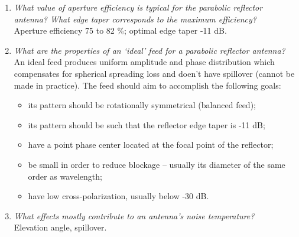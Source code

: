 \documentclass[11pt,a4paper]{article}
\begin{document}
\begin{enumerate}
    \item \emph{What value of aperture efficiency is typical for the parabolic reflector antenna? What edge taper corresponds to the maximum efficiency?}\\
    Aperture efficiency 75 to 82 \%; optimal edge taper -11 dB.
    
    \item \emph{What are the properties of an `ideal' feed for a parabolic reflector antenna?}\\
    An ideal feed produces uniform amplitude and phase distribution which compensates for spherical spreading loss and doen't have spillover (cannot be made in practice). The feed should aim to accomplish the following goals:
    \begin{itemize}
        \item its pattern should be rotationally symmetrical (balanced feed);
        \item its pattern should be such that the reflector edge taper is -11 dB;
        \item have a point phase center located at the focal point of the reflector;
        \item be small in order to reduce blockage -- usually its diameter of the same order as wavelength;
        \item have low cross-polarization, usually below -30 dB.
    \end{itemize}
    
    \item \emph{What effects mostly contribute to an antenna's noise temperature?}\\
    Elevation angle, spillover.
    
\end{enumerate}
\end{document}

